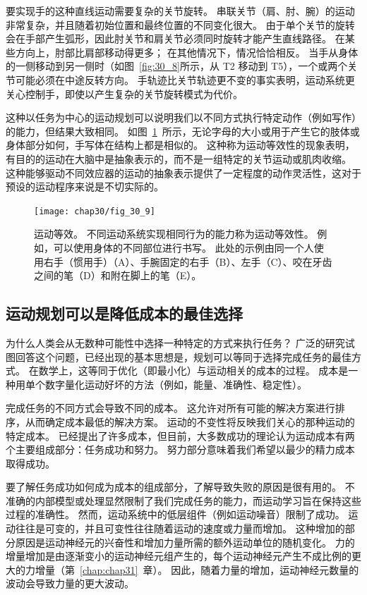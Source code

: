 要实现手的这种直线运动需要复杂的关节旋转。
串联关节（肩、肘、腕）的运动非常复杂，并且随着初始位置和最终位置的不同变化很大。
由于单个关节的旋转会在手部产生弧形，因此肘关节和肩关节必须同时旋转才能产生直线路径。
在某些方向上，肘部比肩部移动得更多；
在其他情况下，情况恰恰相反。
当手从身体的一侧移动到另一侧时（如图~\ref{fig:30_8}所示，从 T2 移动到 T5），一个或两个关节可能必须在中途反转方向。
手轨迹比关节轨迹更不变的事实表明，运动系统更关心控制手，即使以产生复杂的关节旋转模式为代价。


这种以任务为中心的运动规划可以说明我们以不同方式执行特定动作（例如写作）的能力，但结果大致相同。
如图~\ref{fig:30_9}~所示，无论字母的大小或用于产生它的肢体或身体部分如何，手写体在结构上都是相似的。
这种称为运动等效性的现象表明，有目的的运动在大脑中是抽象表示的，而不是一组特定的关节运动或肌肉收缩。
这种能够驱动不同效应器的运动的抽象表示提供了一定程度的动作灵活性，这对于预设的运动程序来说是不切实际的。


\begin{figure}[htbp]
	\centering
	\texttt{[image: chap30/fig\_30\_9]}
	\caption{运动等效。
		不同运动系统实现相同行为的能力称为运动等效性。
		例如，可以使用身体的不同部位进行书写。
		此处的示例由同一个人使用右手（惯用手）（A）、手腕固定的右手（B）、左手（C）、咬在牙齿之间的笔（D）和附在脚上的笔（E）。}
	\label{fig:30_9}
\end{figure}



\subsection{运动规划可以是降低成本的最佳选择}

为什么人类会从无数种可能性中选择一种特定的方式来执行任务？
广泛的研究试图回答这个问题，已经出现的基本思想是，规划可以等同于选择完成任务的最佳方式。
在数学上，这等同于优化（即最小化）与运动相关的成本的过程。
成本是一种用单个数字量化运动好坏的方法（例如，能量、准确性、稳定性）。


完成任务的不同方式会导致不同的成本。
这允许对所有可能的解决方案进行排序，从而确定成本最低的解决方案。
运动的不变性将反映我们关心的那种运动的特定成本。
已经提出了许多成本，但目前，大多数成功的理论认为运动成本有两个主要组成部分：任务成功和努力。
努力部分意味着我们希望以最少的精力成本取得成功。


要了解任务成功如何成为成本的组成部分，了解导致失败的原因是很有用的。
不准确的内部模型或处理显然限制了我们完成任务的能力，而运动学习旨在保持这些过程的准确性。
然而，运动系统中的低层组件（例如运动噪音）限制了成功。
运动往往是可变的，并且可变性往往随着运动的速度或力量而增加。
这种增加的部分原因是运动神经元的兴奋性和增加力量所需的额外运动单位的随机变化。
力的增量增加是由逐渐变小的运动神经元组产生的，每个运动神经元产生不成比例的更大的力增量（第~\ref{chap:chap31}~章）。
因此，随着力量的增加，运动神经元数量的波动会导致力量的更大波动。


